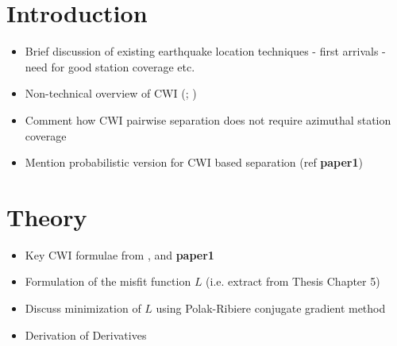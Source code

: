 \documentclass[draft,jgrga]{agutex}
\begin{document}

\begin{abstract}
(Type abstract here)
\end{abstract}

%
%

%

\begin{article}

%
%

\section{Introduction}
\begin{itemize}
\item Brief discussion of existing earthquake location techniques - first arrivals - need for good station coverage etc.
\item Non-technical overview of CWI (\citealp{dr_Snieder05a}; \citealp{dr_Snieder06a})
\item Comment how CWI pairwise separation does not require azimuthal station coverage \citep{dr_Robinson07b}
\item Mention probabilistic version for CWI based separation (ref \textbf{paper1})
\end{itemize}

\section{Theory}
\begin{itemize}
\item Key CWI formulae from \citet{dr_Snieder05a},
\citet{dr_Snieder06a} and \textbf{paper1}
\item Formulation of the misfit function $L$ (i.e. extract from Thesis Chapter 5)
\item Discuss minimization of $L$ using Polak-Ribiere conjugate gradient method
\item Derivation of Derivatives
\end{itemize}


\end{article}
\end{document}
